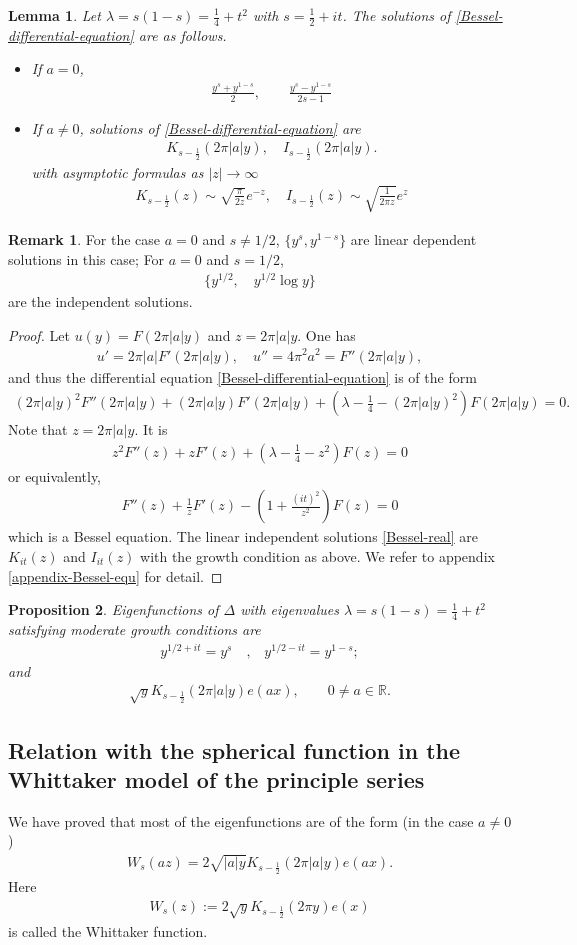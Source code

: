 \documentclass[11pt,reqno]{amsart}
\newcommand{\bea}{\begin{eqnarray}}
\newcommand{\eea}{\end{eqnarray}}
\newcommand{\bna}{\begin{eqnarray*}}
\newcommand{\ena}{\end{eqnarray*}}
\def\R{\mathbb{R}}
\newtheorem{lemma}{Lemma}[section]
\newtheorem{prop}[lemma]{Proposition}
\theoremstyle{definition}
\newtheorem{remark}{Remark}
\newcommand{\bit}{\begin{itemize}}
\newcommand{\eit}{\end{itemize}}
\begin{document}
\begin{lemma}
Let $\lambda=s(1-s)=\frac{1}{4}+t^2$ with $s=\frac{1}{2}+it$.
The solutions of \eqref{Bessel-differential-equation} are
as follows.
\bit
\item
If $a=0$,
\bna
\frac{y^s+y^{1-s}}{2},\qquad\frac{y^s-y^{1-s}}{2s-1}
\ena
\item If $a\neq 0$,
 solutions of \eqref{Bessel-differential-equation} are
\bna
K_{s-\frac{1}{2}}(2\pi |a|y),\quad I_{s-\frac{1}{2}}(2\pi|a|y).
\ena
with asymptotic formulas as $|z|\rightarrow\infty$
\bna
K_{s-\frac{1}{2}}(z)\sim
\sqrt{\frac{\pi}{2z}} e^{-z},\quad I_{s-\frac{1}{2}}(z)\sim\sqrt{\frac{1}{2\pi z}}e^{z}
\ena
\eit

\end{lemma}
\begin{remark}
For the case $a=0$ and $s\neq 1/2$, $\{y^s, y^{1-s}\}$
are linear dependent solutions in this case;
For $a=0$ and $s=1/2$,
\bna
\{y^{1/2},\quad y^{1/2}\log y\}
\ena
are the independent solutions.
\end{remark}
\begin{proof}
Let $u(y)=F(2\pi |a|y)$ and $z=2\pi|a|y$.
One has
\bna
u'=2\pi|a| F'(2\pi |a|y),\quad
u''=4\pi^2 a^2=F''(2\pi |a|y),
\ena
and thus the differential equation \eqref{Bessel-differential-equation} is of the form
\bna
(2\pi |a|y)^2F''(2\pi|a|y)+ (2\pi|a|y)F'(2\pi|a|y)
+\left(\lambda-\frac{1}{4}-(2\pi|a|y)^2\right)F(2\pi|a|y)=0.
\ena
Note that  $z=2\pi|a|y$. It is
\bna
z^2F''(z)+zF'(z)+\left(\lambda-\frac{1}{4}-z^2\right)F(z)=0
\ena
or equivalently,
\bea
F''(z)+\frac{1}{z}F'(z)-\left(1+\frac{(it)^2}{z^2}\right)F(z)=0
\label{Bessel-real}
\eea
which is a Bessel equation.
The linear independent solutions \eqref{Bessel-real} are $K_{it}(z)$ and $I_{it}(z)$
with the growth condition as above.
We refer to appendix \ref{appendix-Bessel-equ} for detail.
\end{proof}



\begin{prop}
Eigenfunctions of $\Delta$ with eigenvalues
$\lambda=s(1-s)=\frac{1}{4}+t^2$  satisfying moderate growth conditions
are
\bna
y^{1/2+it}=y^{s}\quad\mbox{,} \quad y^{1/2-it}=y^{1-s};
\ena
and
\bna
\sqrt{y}K_{s-\frac{1}{2}}(2\pi|a|y)e(ax),\qquad 0\neq a\in \R.
\ena
\end{prop}

\subsection{Relation with the spherical function
in the Whittaker model of the principle series}
We have proved that most of the eigenfunctions are of the form (in the case $a\neq0$)
\bna
W_s(az)=
2\sqrt{|a|y}K_{s-\frac{1}{2}}(2\pi |a|y)e(ax).
\ena
Here
\bea
W_s(z):= 2\sqrt{y}K_{s-\frac{1}{2}}(2\pi y)e(x)\label{Whittkaer}
\eea
is called the Whittaker function.
\end{document}

